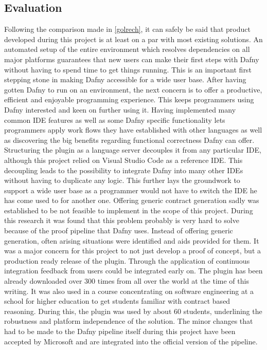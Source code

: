 \subsection{Evaluation}\label{evaluation}
Following the comparison made in \ref{golrech}, it can safely be said that product developed during this project is at least on a par with most existing solutions. An automated setup of the entire environment which resolves dependencies on all major platforms guarantees that new users can make their first steps with Dafny without having to spend time to get things running. This is an important first stepping stone in making Dafny accessible for a wide user base. \newline
After having gotten Dafny to run on an environment, the next concern is to offer a productive, efficient and enjoyable programming experience. This keeps programmers using Dafny interested and keen on further using it. Having implemented many common IDE features as well as some Dafny specific functionality lets programmers apply work flows they have established with other languages as well as discovering the big benefits regarding functional correctness Dafny can offer. \newline
Structuring the plugin as a language server decouples it from any particular IDE, although this project relied on Visual Studio Code as a reference IDE. This decoupling leads to the possibility to integrate Dafny into many other IDEs without having to duplicate any logic. This further lays the groundwork to support a wide user base as a programmer would not have to switch the IDE he has come used to for another one. \newline
Offering generic contract generation sadly was established to be not feasible to implement in the scope of this project. During this research it was found that this problem probably is very hard to solve because of the proof pipeline that Dafny uses. Instead of offering generic generation, often arising situations were identified and aids provided for them.\newline
It was a major concern for this project to not just develop a proof of concept, but a production ready release of the plugin. Through the application of continuous integration feedback from users could be integrated early on. The plugin has been already downloaded over 300 times from all over the world at the time of this writing. It was also used in a course concentrating on software engineering at a school for higher education to get students familiar with contract based reasoning. During this, the plugin was used by about 60 students, underlining the robustness and platform independence of the solution. The minor changes that had to be made to the Dafny pipeline itself during this project have been accepted by Microsoft and are integrated into the official version of the pipeline. \newline
